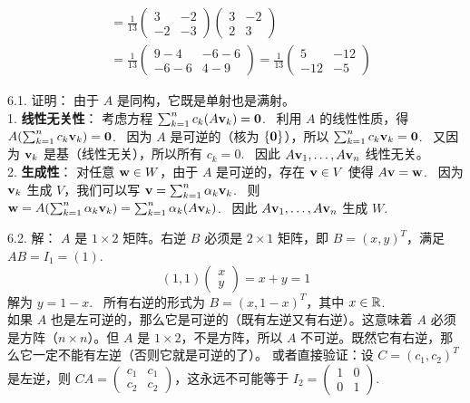 \begin{exer}
$$\begin{aligned}
&= \frac{1}{13} \begin{pmatrix} 3 & -2 \\ -2 & -3 \end{pmatrix} \begin{pmatrix} 3 & -2 \\ 2 & 3 \end{pmatrix} \\
&= \frac{1}{13} \begin{pmatrix} 9-4 & -6-6 \\ -6-6 & 4-9 \end{pmatrix} = \frac{1}{13} \begin{pmatrix} 5 & -12 \\ -12 & -5 \end{pmatrix}
\end{aligned}
$$


\vspace{5ex}


6.1. 证明：
由于 $A$ 是同构，它既是单射也是满射。\\
1. \textbf{线性无关性}：
考虑方程 $\sum_{k=1}^n c_k (A\mathbf{v}_k) = \mathbf{0}$.~
利用 $A$ 的线性性质，得 $A(\sum_{k=1}^n c_k \mathbf{v}_k) = \mathbf{0}$.~
因为 $A$ 是可逆的（核为 $\{\mathbf{0}\}$），所以 $\sum_{k=1}^n c_k \mathbf{v}_k = \mathbf{0}$.~
又因为 $\mathbf{v}_k$ 是基（线性无关），所以所有 $c_k = 0$.~
因此 $A\mathbf{v}_1, \dots, A\mathbf{v}_n$ 线性无关。\\
2. \textbf{生成性}：
对任意 $\mathbf{w} \in W$，由于 $A$ 是可逆的，存在 $\mathbf{v} \in V$ 使得 $A\mathbf{v} = \mathbf{w}$.~
因为 $\mathbf{v}_k$ 生成 $V$，我们可以写 $\mathbf{v} = \sum_{k=1}^n \alpha_k \mathbf{v}_k$.~
则 $\mathbf{w} = A(\sum_{k=1}^n \alpha_k \mathbf{v}_k) = \sum_{k=1}^n \alpha_k (A\mathbf{v}_k)$.~
因此 $A\mathbf{v}_1, \dots, A\mathbf{v}_n$ 生成 $W$.~

6.2. 解：
$A$ 是 $1 \times 2$ 矩阵。右逆 $B$ 必须是 $2 \times 1$ 矩阵，即 $B = (x, y)^T$，满足 $AB = I_1 = (1)$.~
$$ (1, 1) \begin{pmatrix} x \\ y \end{pmatrix} = x + y = 1 $$
解为 $y = 1 - x$.~
所有右逆的形式为 $B = (x, 1-x)^T$，其中 $x \in \mathbb{R}$.~
\\
如果 $A$ 也是左可逆的，那么它是可逆的（既有左逆又有右逆）。这意味着 $A$ 必须是方阵（$n \times n$）。但 $A$ 是 $1 \times 2$，不是方阵，所以 $A$ 不可逆。既然它有右逆，那么它一定不能有左逆（否则它就是可逆的了）。
或者直接验证：设 $C = (c_1, c_2)^T$ 是左逆，则 $CA = \begin{pmatrix} c_1 & c_1 \\ c_2 & c_2 \end{pmatrix}$，这永远不可能等于 $I_2 = \begin{pmatrix} 1 & 0 \\ 0 & 1 \end{pmatrix}$.~


\end{exer}
